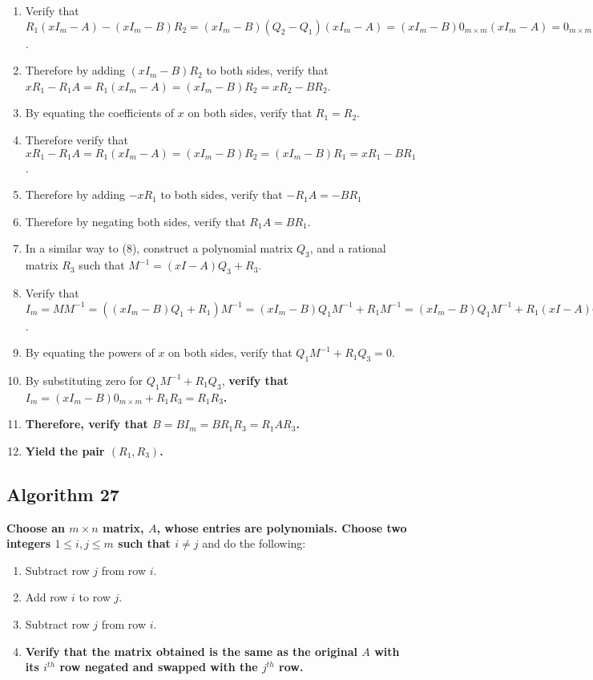 \documentclass[twocolumn]{article}
\begin{document}
\begin{enumerate}
				\item Verify that $R_1(xI_m-A)-(xI_m-B)R_2=(xI_m-B)(Q_2-Q_1)(xI_m-A)=(xI_m-B)0_{m\times m}(xI_m-A)=0_{m\times m}$.
				\item Therefore by adding $(xI_m-B)R_2$ to both sides, verify that $xR_1-R_1A=R_1(xI_m-A)=(xI_m-B)R_2=xR_2-BR_2$.
				\item By equating the coefficients of $x$ on both sides, verify that $R_1=R_2$.
				\item Therefore verify that $xR_1-R_1A=R_1(xI_m-A)=(xI_m-B)R_2=(xI_m-B)R_1=xR_1-BR_1$.
				\item Therefore by adding $-xR_1$ to both sides, verify that $-R_1A=-BR_1$
				\item Therefore by negating both sides, verify that $R_1A=BR_1$.
				\item In a similar way to (8), construct a polynomial matrix $Q_3$, and a rational matrix $R_3$ such that $M^{-1}=(xI-A)Q_3+R_3$.
				\item Verify that $I_m=MM^{-1}=((xI_m-B)Q_1+R_1)M^{-1}=(xI_m-B)Q_1M^{-1}+R_1M^{-1}=(xI_m-B)Q_1M^{-1}+R_1(xI-A)Q_3+R_1R_3=(xI_m-B)Q_1M^{-1}+(xI-B)R_1Q_3+R_1R_3=(xI_m-B)(Q_1M^{-1}+R_1Q_3)+R_1R_3$.
				\item By equating the powers of $x$ on both sides, verify that $Q_1M^{-1}+R_1Q_3=0$.
				\item By substituting zero for $Q_1M^{-1}+R_1Q_3$, \textbf{verify that $I_m=(xI_m-B)0_{m\times m}+R_1R_3=R_1R_3$.}
				\item \textbf{Therefore, verify that $B=BI_m=BR_1R_3=R_1AR_3$.}
				\item \textbf{Yield the pair $(R_1,R_3)$.}
			\end{enumerate}
		\subsection{Algorithm 27}\label{sec:algorithm 27}
			\textbf{Choose an $m\times n$ matrix, $A$, whose entries are polynomials. Choose two integers $1\le i,j\le m$ such that $i\ne j$} and do the following:
			\begin{enumerate}
				\item Subtract row $j$ from row $i$.
				\item Add row $i$ to row $j$.
				\item Subtract row $j$ from row $i$.
				\item \textbf{Verify that the matrix obtained is the same as the original $A$ with its $i^{th}$ row negated and swapped with the $j^{th}$ row.}
			\end{enumerate}
\end{document}
